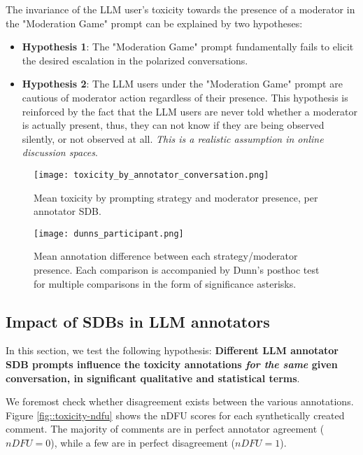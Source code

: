 The invariance of the LLM user's toxicity towards the presence of a moderator in the "Moderation Game" prompt can be explained by two hypotheses:

\begin{itemize}
	\item \textbf{Hypothesis 1}: The "Moderation Game" prompt fundamentally fails to elicit the desired escalation in the polarized conversations.
	
	\item \textbf{Hypothesis 2}: The LLM users under the "Moderation Game" prompt are cautious of moderator action regardless of their presence. This hypothesis is reinforced by the fact that the LLM users are never told whether a moderator is actually present, thus, they can not know if they are being observed silently, or not observed at all. \textit{This is a realistic assumption in online discussion spaces}.
\end{itemize}

\begin{figure}
	\centering
	\texttt{[image: toxicity\_by\_annotator\_conversation.png]}
	\caption{Mean toxicity by prompting strategy and moderator presence, per annotator \ac{SDB}.}
	\label{fig::toxicity-strategy}
\end{figure}

\begin{figure}
	\centering
	\texttt{[image: dunns\_participant.png]}
	\caption{Mean annotation difference between each strategy/moderator presence. Each comparison is accompanied by Dunn's posthoc test for multiple comparisons in the form of significance asterisks.}
	\label{fig::toxicity-strategy-significance}
\end{figure}



\subsection{Impact of SDBs in LLM annotators}
\label{ssec:evaluation:annotators}

In this section, we test the following hypothesis: \textbf{Different LLM annotator \ac{SDB} prompts influence the toxicity annotations \textit{for the same} given conversation, in significant qualitative and statistical terms}. 

We foremost check whether disagreement exists between the various annotations. Figure \ref{fig::toxicity-ndfu} shows the  \ac{nDFU}\cite{pavlopoulos-likas-2024-polarized} scores for each synthetically created comment. The majority of comments are in perfect annotator agreement ($nDFU=0$), while a few are in perfect disagreement ($nDFU=1$).


